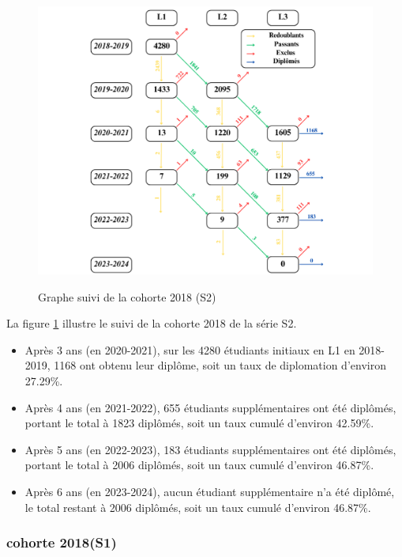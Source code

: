 \begin{figure}[ht]
    \centering
    \caption{Graphe suivi de la cohorte 2018 (S2)}
    \includegraphics[width=1\textwidth]{figure/S2_2018.png}
    \label{fig:cohorte_s2_2018}
\end{figure}

La figure \ref{fig:cohorte_s2_2018} illustre le suivi de la cohorte 2018 de la série S2.
\begin{itemize}
    \item Après 3 ans (en 2020-2021), sur les 4280 étudiants initiaux en L1 en 2018-2019, 1168 ont obtenu leur diplôme, soit un taux de diplomation d'environ 27.29\%.
    \item Après 4 ans (en 2021-2022), 655 étudiants supplémentaires ont été diplômés, portant le total à 1823 diplômés, soit un taux cumulé d'environ 42.59\%.
    \item Après 5 ans (en 2022-2023), 183 étudiants supplémentaires ont été diplômés, portant le total à 2006 diplômés, soit un taux cumulé d'environ 46.87\%.
    \item Après 6 ans (en 2023-2024), aucun étudiant supplémentaire n'a été diplômé, le total restant à 2006 diplômés, soit un taux cumulé d'environ 46.87\%.
\end{itemize}

\newpage
\subsubsection{cohorte 2018(S1)}

